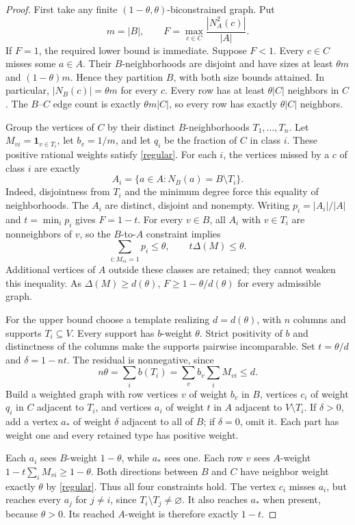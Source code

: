 \documentclass[11pt]{article}
\newcommand{\reach}{N_A^2}
\begin{document}
\begin{proof}
First take any finite $(1-\theta,\theta)$-biconstrained graph. Put
\[
 m=|B|,\qquad F=\max_{c\in C}\frac{|\reach(c)|}{|A|}.
\]
If $F=1$, the required lower bound is immediate.
Suppose $F<1$. Every $c\in C$ misses
some $a\in A$. Their $B$-neighborhoods are disjoint and have sizes
at least $\theta m$ and $(1-\theta)m$. Hence they partition $B$,
with both size bounds attained. In particular,
$|N_B(c)|=\theta m$ for every $c$.
Every row has at least $\theta|C|$ neighbors in $C$.
The $B$--$C$ edge count is exactly $\theta m|C|$,
so every row has exactly $\theta|C|$ neighbors.

Group the vertices of $C$ by their distinct $B$-neighborhoods
$T_1,\ldots,T_n$. Let $M_{vi}=\mathbf1_{v\in T_i}$, let
$b_v=1/m$, and let $q_i$ be the fraction of $C$ in class $i$.
These positive rational weights satisfy \eqref{regular}.
For each $i$, the vertices missed by a $c$ of class $i$ are exactly
\[
 A_i=\{a\in A:N_B(a)=B\setminus T_i\}.
\]
Indeed, disjointness from $T_i$ and the minimum degree force this
equality of neighborhoods. The $A_i$ are distinct, disjoint and
nonempty. Writing $p_i=|A_i|/|A|$ and $t=\min_i p_i$ gives
$F=1-t$. For every $v\in B$, all $A_i$ with $v\in T_i$ are
nonneighbors of $v$, so the $B$-to-$A$ constraint implies
\[
 \sum_{i:M_{vi}=1}p_i\leq\theta,
 \qquad t\Delta(M)\leq\theta.
\]
Additional vertices of $A$ outside these classes are retained;
they cannot weaken this inequality. As $\Delta(M)\geq d(\theta)$,
$F\geq1-\theta/d(\theta)$ for every admissible graph.

For the upper bound choose a template realizing $d=d(\theta)$,
with $n$ columns and supports $T_i\subseteq V$. Every support
has $b$-weight $\theta$. Strict positivity of $b$ and distinctness
of the columns make the supports pairwise incomparable.
Set $t=\theta/d$ and $\delta=1-nt$. The residual is nonnegative,
since
\[
 n\theta=\sum_i b(T_i)=\sum_v b_v\sum_i M_{vi}\leq d.
\]
Build a weighted graph with row vertices $v$ of weight $b_v$ in $B$,
vertices $c_i$ of weight $q_i$ in $C$ adjacent to $T_i$, and vertices
$a_i$ of weight $t$ in $A$ adjacent to $V\setminus T_i$.
If $\delta>0$, add a vertex $a_*$ of weight $\delta$ adjacent
to all of $B$; if $\delta=0$, omit it. Each part has weight one
and every retained type has positive weight.

Each $a_i$ sees $B$-weight $1-\theta$, while $a_*$ sees one.
Each row $v$ sees $A$-weight
$1-t\sum_iM_{vi}\geq1-\theta$. Both directions between $B$
and $C$ have neighbor weight exactly $\theta$ by \eqref{regular}.
Thus all four constraints hold. The vertex $c_i$ misses $a_i$,
but reaches every $a_j$ for $j\ne i$, since
$T_i\setminus T_j\ne\varnothing$. It also reaches $a_*$ when
present, because $\theta>0$. Its reached $A$-weight is therefore
exactly $1-t$.


\end{proof}
\end{document}
